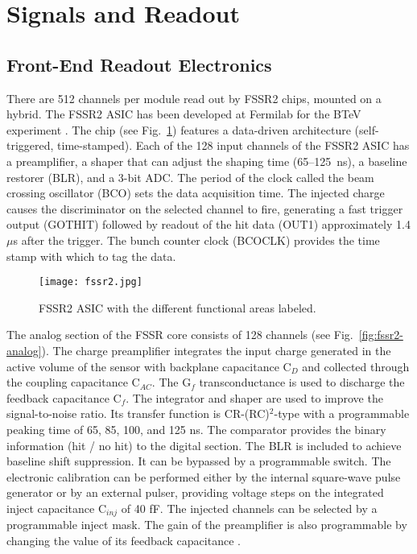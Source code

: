 \section{Signals and Readout}

\subsection{Front-End Readout Electronics}

There are 512 channels per module read out by FSSR2 chips, mounted on a hybrid. The FSSR2 ASIC has been developed at Fermilab for the BTeV experiment \cite{FSSR}. The chip (see Fig.~\ref{fig:fssr2}) features a data-driven architecture (self-triggered, time-stamped). Each of the 128 input channels of the FSSR2 ASIC has a preamplifier, a shaper that can adjust the shaping time (65--125~ns), a baseline restorer (BLR), and a 3-bit ADC. The period of the clock called the beam crossing oscillator (BCO) sets the data acquisition time. The injected charge causes the discriminator on the selected channel to fire, generating a fast trigger output (GOTHIT) followed by readout of the hit data (OUT1) approximately 1.4 $\mu$s after the trigger. The bunch counter clock (BCOCLK) provides the time stamp with which to tag the data. 

\begin{figure}[hbt] 
\centering 
\texttt{[image: fssr2.jpg]}
\caption{FSSR2 ASIC with the different functional areas labeled.}
\label{fig:fssr2}
\end{figure}

The analog section of the FSSR core consists of 128 channels (see Fig.~\ref{fig:fssr2-analog}). The charge preamplifier integrates the input charge generated in the active volume of the sensor with backplane capacitance C$_D$ and collected through the coupling capacitance C$_{AC}$. The G$_f$ transconductance is used to discharge the feedback capacitance C$_f$. The integrator and shaper are used to improve the signal-to-noise ratio. Its transfer function is CR-(RC)$^2$-type with a programmable peaking time of 65, 85, 100, and 125 ns. The comparator provides the binary information (hit / no hit) to the digital section. The BLR is included to achieve baseline shift suppression. It can be bypassed by a programmable switch. The electronic calibration can be performed either by the internal square-wave pulse generator or by an external pulser, providing voltage steps on the integrated inject capacitance C$_{inj}$ of 40 fF. The injected channels can be selected by a programmable inject mask.  The gain of the preamplifier is also programmable by changing the value of its feedback capacitance \cite{DINARDOTHESIS}.

